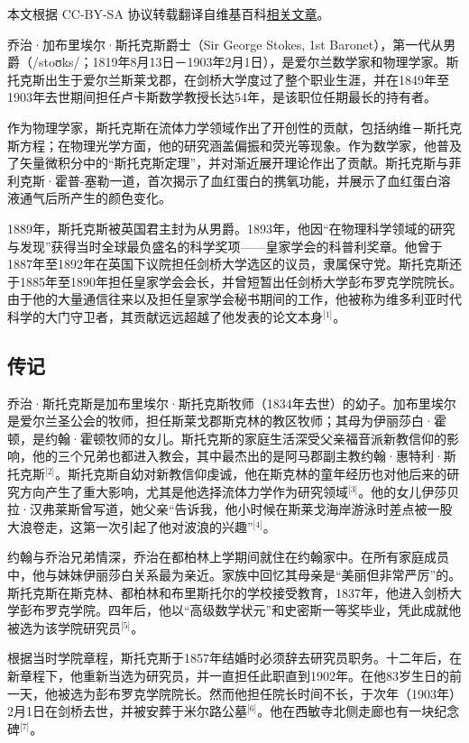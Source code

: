 
本文根据 CC-BY-SA 协议转载翻译自维基百科\href{https://en.wikipedia.org/wiki/Sir_George_Stokes,_1st_Baronet}{相关文章}。


乔治·加布里埃尔·斯托克斯爵士（Sir George Stokes, 1st Baronet），第一代从男爵（/stoʊks/；1819年8月13日－1903年2月1日），是爱尔兰数学家和物理学家。斯托克斯出生于爱尔兰斯莱戈郡，在剑桥大学度过了整个职业生涯，并在1849年至1903年去世期间担任卢卡斯数学教授长达54年，是该职位任期最长的持有者。

作为物理学家，斯托克斯在流体力学领域作出了开创性的贡献，包括纳维－斯托克斯方程；在物理光学方面，他的研究涵盖偏振和荧光等现象。作为数学家，他普及了矢量微积分中的“斯托克斯定理”，并对渐近展开理论作出了贡献。斯托克斯与菲利克斯·霍普-塞勒一道，首次揭示了血红蛋白的携氧功能，并展示了血红蛋白溶液通气后所产生的颜色变化。

1889年，斯托克斯被英国君主封为从男爵。1893年，他因“在物理科学领域的研究与发现”获得当时全球最负盛名的科学奖项——皇家学会的科普利奖章。他曾于1887年至1892年在英国下议院担任剑桥大学选区的议员，隶属保守党。斯托克斯还于1885年至1890年担任皇家学会会长，并曾短暂出任剑桥大学彭布罗克学院院长。由于他的大量通信往来以及担任皇家学会秘书期间的工作，他被称为维多利亚时代科学的大门守卫者，其贡献远远超越了他发表的论文本身\(^\text{[1]}\)。
\subsection{传记}
乔治·斯托克斯是加布里埃尔·斯托克斯牧师（1834年去世）的幼子。加布里埃尔是爱尔兰圣公会的牧师，担任斯莱戈郡斯克林的教区牧师；其母为伊丽莎白·霍顿，是约翰·霍顿牧师的女儿。斯托克斯的家庭生活深受父亲福音派新教信仰的影响，他的三个兄弟也都进入教会，其中最杰出的是阿马郡副主教约翰·惠特利·斯托克斯\(^\text{[2]}\)。斯托克斯自幼对新教信仰虔诚，他在斯克林的童年经历也对他后来的研究方向产生了重大影响，尤其是他选择流体力学作为研究领域\(^\text{[3]}\)。他的女儿伊莎贝拉·汉弗莱斯曾写道，她父亲“告诉我，他小时候在斯莱戈海岸游泳时差点被一股大浪卷走，这第一次引起了他对波浪的兴趣”\(^\text{[4]}\)。

约翰与乔治兄弟情深，乔治在都柏林上学期间就住在约翰家中。在所有家庭成员中，他与妹妹伊丽莎白关系最为亲近。家族中回忆其母亲是“美丽但非常严厉”的。斯托克斯在斯克林、都柏林和布里斯托尔的学校接受教育，1837年，他进入剑桥大学彭布罗克学院。四年后，他以“高级数学状元”和史密斯一等奖毕业，凭此成就他被选为该学院研究员\(^\text{[5]}\)。

根据当时学院章程，斯托克斯于1857年结婚时必须辞去研究员职务。十二年后，在新章程下，他重新当选为研究员，并一直担任此职直到1902年。在他83岁生日的前一天，他被选为彭布罗克学院院长。然而他担任院长时间不长，于次年（1903年）2月1日在剑桥去世，并被安葬于米尔路公墓\(^\text{[6]}\)。他在西敏寺北侧走廊也有一块纪念碑\(^\text{[7]}\)。
